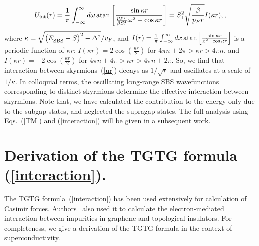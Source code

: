 \documentclass[twocolumn,showpacs,floatfix,longbibliography]{revtex4-1}
\begin{document}
\begin{widetext}
\begin{align}
	U_{\rm int}(r) = \frac{1}{\pi}\int_{-\infty}^\infty d\omega\, {\rm atan}\left[\frac{\sin \kappa r}{\frac{p_Fr}{\beta S_1^4}\omega^2-\cos \kappa r}  \right] = S_1^2\sqrt{\frac{\beta}{p_Fr}} I(\kappa r), 	\label{ur},
\end{align}
where $\kappa = \sqrt{\left( E^{-}_{\rm SBS}-S \right)^2-\Delta^2}/v_F$, and $I(r)=\frac{1}{\pi}\int_{-\infty}^\infty dx\, {\rm atan}\left[\frac{\sin \kappa r}{x^2-\cos \kappa r}  \right]$ is a periodic function of $\kappa r$: $I(\kappa r)= 2 \cos\left( \frac{\kappa r}{2} \right)$ for $4\pi n+2\pi>\kappa r>4\pi n$, and $I(\kappa r)= - 2 \cos\left( \frac{\kappa r}{2} \right)$ for $4\pi n+4\pi>\kappa r>4\pi n + 2\pi$. So, we find that interaction between skyrmions~(\ref{ur}) decays as $1/\sqrt{r}$ and oscillates at a scale of $1/\kappa$. In colloquial terms, the oscillating long-range SBS wavefunctions corresponding to distinct skyrmions determine the effective interaction between skyrmions. Note that, we have calculated the contribution to the energy only due to the subgap states, and neglected the supragap states. The full analysis using Eqs.~(\ref{TM}) and (\ref{interaction}) will be given in a subsequent work.   
\section{Derivation of the TGTG formula (\ref{interaction}).} \label{sec:TGTG}
The TGTG formula~(\ref{interaction}) has been used extensively for calculation of Casimir forces. Authors~\cite{Shytov2009,Abanin2011} also used it to calculate the electron-mediated interaction between impurities in graphene and topological insulators. For completeness, we give a derivation of the TGTG formula in the context of superconductivity. 


\end{widetext}
\end{document}
